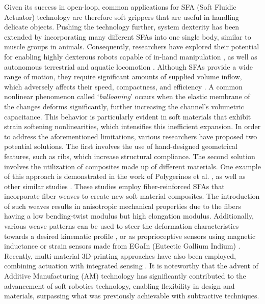 Given its success in open-loop, common applications for SFA (Soft Fluidic Actuator) technology are therefore soft grippers \cite{Galloway2016, Hughes2016Nov, Ansari2022Sep, Teleshev1981, Sinatra2019Aug} that are useful in handling delicate objects. Pushing the technology further, system dexterity has been extended by incorporating many different SFAs into one single body, similar to muscle groups in animals. Consequently, researchers have explored their potential for enabling highly dexterous robots capable of in-hand manipulation \cite{Suzumori1991, Graule2022}, as well as autonomous terrestrial and aquatic locomotion \cite{Choi2011, Katzschmann2018, Drotman2017, Suzumori1992}. Although SFAs provide a wide range of motion, they require significant amounts of supplied volume inflow, which adversely affects their speed, compactness, and efficiency \cite{Overvelde2015Sep, Rus2015, Xavier2022Jun}. A common nonlinear phenomenon called `\emph{ballooning}' occurs when the elastic membrane of the changes deforms significantly, further increasing the channel's volumetric capacitance. This behavior is particularly evident in soft materials that exhibit strain softening nonlinearities, which intensifies this inefficient expansion. In order to address the aforementioned limitations, various researchers have proposed two potential solutions. The first involves the use of hand-designed geometrical features, such as ribs, which increase structural compliance. The second solution involves the utilization of composites made up of different materials. One example of this approach is demonstrated in the work of Polygerinos et al. \cite{Polygerinos2015, Polygerinos2013}, as well as other similar studies \cite{Fras2018Oct, Suzumori1991, Cianchetti2013Nov}. These studies employ fiber-reinforced SFAs that incorporate fiber weaves to create new soft material composites. The introduction of such weaves results in anisotropic mechanical properties due to the fibers having a low bending-twist modulus but high elongation modulus. Additionally, various weave patterns can be used to steer the deformation characteristics towards a desired kinematic profile \cite{Kim2019Aug, Connolly2017Jan}, or as proprioceptive sensors using magnetic inductance \cite{Felt2019Feb, Felt2015Oct} or strain sensors made from EGaIn (Eutectic Gallium Indium) \cite{Park2012,Tapia2020}. Recently, multi-material 3D-printing approaches have also been employed, combining actuation with integrated sensing \cite{Wolterink2022Oct, Zhou2021Apr}. It is noteworthy that the advent of Additive Manufacturing (AM) technology has significantly contributed to the advancement of soft robotics technology, enabling flexibility in design and materials, surpassing what was previously achievable with subtractive techniques.

